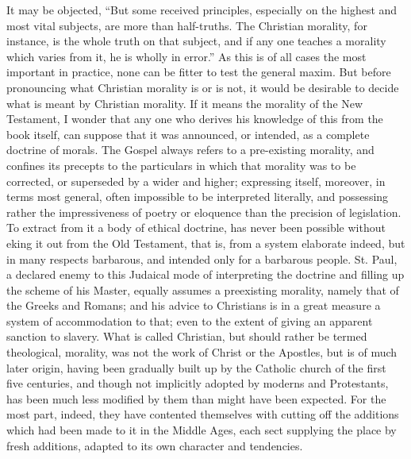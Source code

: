 \documentclass[11pt,openany]{book}
\begin{document}
It may be objected, ``But some received principles, especially on the highest and most vital subjects, are more than half-truths. The Christian morality, for instance, is the whole truth on that subject, and if any one teaches a morality which varies from it, he is wholly in error.'' As this is of all cases the most important in practice, none can be fitter to test the general maxim. But before pronouncing what Christian morality is or is not, it would be desirable to decide what is meant by Christian morality. If it means the morality of the New Testament, I wonder that any one who derives his knowledge of this from the book itself, can suppose that it was announced, or intended, as a complete doctrine of morals. The Gospel always refers to a pre-existing morality, and confines its precepts to the particulars in which that morality was to be corrected, or superseded by a wider and higher; expressing itself, moreover, in terms most general, often impossible to be interpreted literally, and possessing rather the impressiveness of poetry or eloquence than the precision of legislation. To extract from it a body of ethical doctrine, has never been possible without eking it out from the Old Testament, that is, from a system elaborate indeed, but in many respects barbarous, and intended only for a barbarous people. St. Paul, a declared enemy to this Judaical mode of interpreting the doctrine and filling up the scheme of his Master, equally assumes a preexisting morality, namely that of the Greeks and Romans; and his advice to Christians is in a great measure a system of accommodation to that; even to the extent of giving an apparent sanction to slavery. What is called Christian, but should rather be termed theological, morality, was not the work of Christ or the Apostles, but is of much later origin, having been gradually built up by the Catholic church of the first five centuries, and though not implicitly adopted by moderns and Protestants, has been much less modified by them than might have been expected. For the most part, indeed, they have contented themselves with cutting off the additions which had been made to it in the Middle Ages, each sect supplying the place by fresh additions, adapted to its own character and tendencies.
\end{document}
